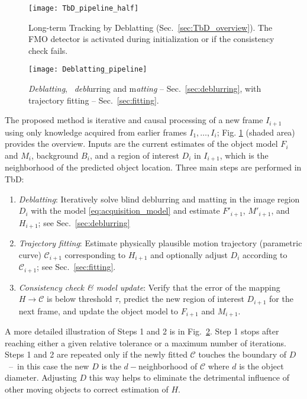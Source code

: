 \documentclass[10pt,twocolumn,letterpaper]{article}
\newcommand{\C}{\mathcal{C}}
\begin{document}
\begin{figure}[!t]
\centering
\texttt{[image: TbD\_pipeline\_half]}
\caption{Long-term Tracking by Deblatting (Sec.~\ref{sec:TbD_overview}). The FMO detector is activated during initialization or if the consistency check fails.
\label{fig:pipeline_whole}}
\end{figure}

\begin{figure}[!t]
\centering
\texttt{[image: Deblatting\_pipeline]}
\caption{{\it Deblatting}, \ie~{\it debl}urring and m{\it atting} -- Sec.~\ref{sec:deblurring}, with trajectory fitting -- Sec.~\ref{sec:fitting}. 
\label{fig:pipeline_deblatting}}
\end{figure}

The proposed method is iterative and causal processing of a new frame $I_{i+1}$ using only knowledge acquired from earlier frames ${I_1,\ldots,I_i}$; Fig. \ref{fig:pipeline_whole} (shaded area) provides the overview. Inputs are the current estimates of the object model $F_i$ and $M_i$, background $B_i$, and a region of interest $D_i$ in $I_{i+1}$, which is the neighborhood of the predicted object location. Three main steps are performed in TbD:
\vspace*{-0.5em}
\begin{enumerate}[leftmargin=*]
\setlength\itemsep{-0.25em}
	\item \emph{Deblatting}: Iteratively solve blind deblurring and matting in the image region $D_i$ with the model \eqref{eq:acquisition_model} and estimate $F'_{i+1}$, $M'_{i+1}$, and $H_{i+1}$; see Sec.~\ref{sec:deblurring}
	\item \emph{Trajectory fitting}: Estimate physically plausible motion trajectory (parametric curve) $\C_{i+1}$ corresponding to $H_{i+1}$ and optionally adjust $D_i$ according to $\C_{i+1}$; see Sec.~\ref{sec:fitting}.
	\item \emph{Consistency check \& model update}: Verify that the error of the mapping $H\to \C$ is below threshold $\tau$, predict the new region of interest $D_{i+1}$ for the next frame, and update the object model to $F_{i+1}$ and $M_{i+1}$.
\end{enumerate}
\vspace*{-0.5em}
A more detailed illustration of Steps 1 and 2 is in Fig.~\ref{fig:pipeline_deblatting}. Step 1 stops after reaching either a given relative tolerance or a maximum number of iterations. Steps 1 and 2 are repeated only if the newly fitted $\C$ touches the boundary of $D$~--~in this case the new $D$ is the $d-$neighborhood of $\C$ where $d$ is the object diameter. Adjusting $D$ this way helps to eliminate the detrimental influence of other moving objects to correct estimation of $H$.
\end{document}
